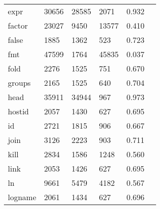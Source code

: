 \begin{longtable}{lp{2.4cm}p{2.4cm}p{2.4cm}p{2.4cm}p{2.4cm}}
expr      &                                   30656 &                       28585 &                         2071 &                                   0.932 \\
factor    &                                   23027 &                        9450 &                        13577 &                                   0.410 \\
false     &                                    1885 &                        1362 &                          523 &                                   0.723 \\
fmt       &                                   47599 &                        1764 &                        45835 &                                   0.037 \\
fold      &                                    2276 &                        1525 &                          751 &                                   0.670 \\
groups    &                                    2165 &                        1525 &                          640 &                                   0.704 \\
head      &                                   35911 &                       34944 &                          967 &                                   0.973 \\
hostid    &                                    2057 &                        1430 &                          627 &                                   0.695 \\
id        &                                    2721 &                        1815 &                          906 &                                   0.667 \\
join      &                                    3126 &                        2223 &                          903 &                                   0.711 \\
kill      &                                    2834 &                        1586 &                         1248 &                                   0.560 \\
link      &                                    2053 &                        1426 &                          627 &                                   0.695 \\
ln        &                                    9661 &                        5479 &                         4182 &                                   0.567 \\
logname   &                                    2061 &                        1434 &                          627 &                                   0.696 \\

\end{longtable}
